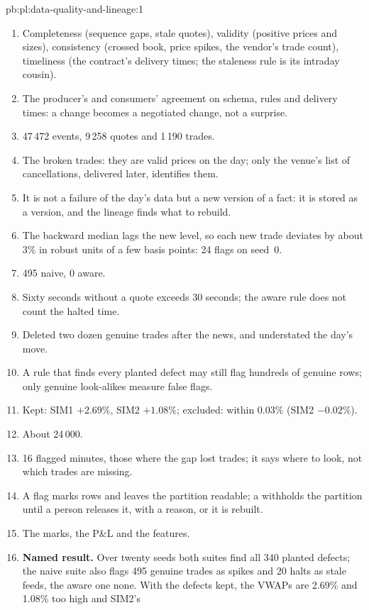 \begin{solution}{pb:pl:data-quality-and-lineage:1}
\begin{enumerate}
\item Completeness (sequence gaps, stale quotes), validity (positive prices and sizes), consistency (crossed book, price spikes, the
vendor's trade count), timeliness (the contract's delivery times; the staleness rule is its intraday cousin).
\item The producer's and consumers' agreement on schema, rules and delivery times: a change becomes a negotiated change, not a
surprise.
\item 47\,472 events, 9\,258 quotes and 1\,190 trades.
\item The broken trades: they are valid prices on the day; only the venue's list of cancellations, delivered later, identifies them.
\item It is not a failure of the day's data but a new version of a fact: it is stored as a version, and the lineage finds what to
rebuild.
\item The backward median lags the new level, so each new trade deviates by about 3\% in robust units of a few basis points: 24 flags
on seed~0.
\item 495 naive, 0 aware.
\item Sixty seconds without a quote exceeds 30 seconds; the aware rule does not count the halted time.
\item Deleted two dozen genuine trades after the news, and understated the day's move.
\item A rule that finds every planted defect may still flag hundreds of genuine rows; only genuine look-alikes measure false flags.
\item Kept: SIM1 $+2.69\%$, SIM2 $+1.08\%$; excluded: within 0.03\% (SIM2 $-0.02\%$).
\item About 24\,000.
\item 16 flagged minutes, those where the gap lost trades; it says where to look, not which trades are missing.
\item A flag marks rows and leaves the partition readable; a  withholds the partition until a person releases it, with a
reason, or it is rebuilt.
\item The marks, the P\&L and the features.
\item \textbf{Named result.} Over twenty seeds both suites find all 340 planted defects; the naive suite also flags 495 genuine trades
as spikes and 20 halts as stale feeds, the aware one none. With the defects kept, the VWAPs are 2.69\% and 1.08\% too high and SIM2's

\end{enumerate}
\end{solution}
